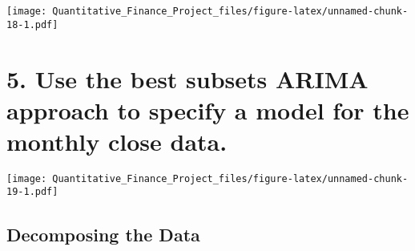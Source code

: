 \documentclass[
]{article}
\newenvironment{Shaded}{\begin{snugshade}}{\end{snugshade}}
\newcommand{\AttributeTok}[1]{\textcolor[rgb]{0.13,0.29,0.53}{#1}}
\newcommand{\CommentTok}[1]{\textcolor[rgb]{0.56,0.35,0.01}{\textit{#1}}}
\newcommand{\DecValTok}[1]{\textcolor[rgb]{0.00,0.00,0.81}{#1}}
\newcommand{\FunctionTok}[1]{\textcolor[rgb]{0.13,0.29,0.53}{\textbf{#1}}}
\newcommand{\NormalTok}[1]{#1}
\newcommand{\OtherTok}[1]{\textcolor[rgb]{0.56,0.35,0.01}{#1}}
\newcommand{\SpecialCharTok}[1]{\textcolor[rgb]{0.81,0.36,0.00}{\textbf{#1}}}
\newcommand{\StringTok}[1]{\textcolor[rgb]{0.31,0.60,0.02}{#1}}
\begin{document}
\texttt{[image: Quantitative\_Finance\_Project\_files/figure-latex/unnamed-chunk-18-1.pdf]}

\newpage

\hypertarget{use-the-best-subsets-arima-approach-to-specify-a-model-for-the-monthly-close-data.}{%
\section{5. Use the best subsets ARIMA approach to specify a model for
the monthly close
data.}\label{use-the-best-subsets-arima-approach-to-specify-a-model-for-the-monthly-close-data.}}

\begin{Shaded}
\end{Shaded}

\texttt{[image: Quantitative\_Finance\_Project\_files/figure-latex/unnamed-chunk-19-1.pdf]}

\hypertarget{decomposing-the-data-2}{%
\subsection{Decomposing the Data}\label{decomposing-the-data-2}}
\end{document}
